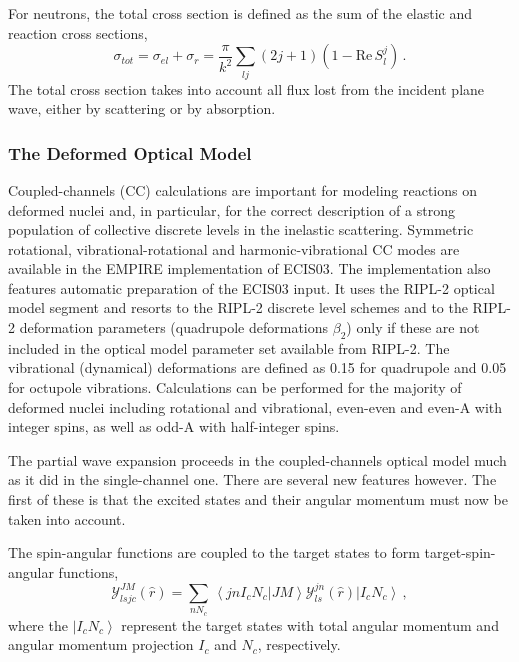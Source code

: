 \documentclass[twocolumn,amsmath,amssymb,10pt,groupedaddress,letter]{revtex4}
\begin{document}
For neutrons, the total cross section is defined as the sum of the
elastic and reaction cross sections, \begin{equation}
\sigma_{tot}=\sigma_{el}+\sigma_{r}=\frac{\pi}{k^{2}}\sum_{lj}(2j+1)(1-\textrm{Re}\, S_{l}^{j})\,.\end{equation}
 The total cross section takes into account all flux lost from the
incident plane wave, either by scattering or by absorption.

\subsubsection{The Deformed Optical Model\label{sec:DWBA-CC}}

Coupled-channels (CC) calculations are important for modeling
reactions on deformed nuclei and,
in particular, for the correct description of a strong population
of collective discrete levels in the inelastic scattering. Symmetric
rotational, vibrational-rotational and harmonic-vibrational CC modes
are available in the EMPIRE implementation of ECIS03. The
implementation also features automatic preparation of
the ECIS03 input. It uses the RIPL-2 \cite{RIPL2} optical
model segment and resorts to the RIPL-2 discrete level schemes and
to the RIPL-2 deformation parameters (quadrupole deformations $\beta_{2}$)
only if these are not included in the optical model parameter set
available from RIPL-2. The vibrational (dynamical) deformations are
defined as 0.15 for quadrupole and 0.05 for octupole vibrations. Calculations
can be performed for the majority of deformed nuclei including rotational
and vibrational, even-even and even-A with integer spins, as well
as odd-A with half-integer spins.

The partial wave expansion proceeds in the coupled-channels optical
model much as it did in the single-channel one. There are several
new features however. The first of these is that the excited states
and their angular momentum must now be taken into account.

The spin-angular functions
are coupled to the target states to form target-spin-angular functions,
\begin{equation}
{\mathcal{Y}}_{lsjc}^{JM}(\hat{r})=\sum_{nN_{c}}\,\left\langle jnI_{c}N_{c}|JM\right\rangle {\mathcal{Y}}_{ls}^{jn}(\hat{r})\left|I_{c}N_{c}\right\rangle \,,\end{equation}
 where the $\left|I_{c}N_{c}\right\rangle $ represent the target
states with total angular momentum and angular momentum projection
$I_{c}$ and $N_{c}$, respectively.
\end{document}
